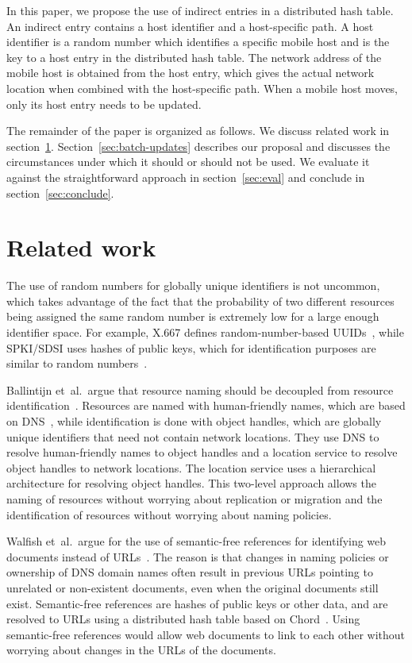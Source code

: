 \documentclass{article}
\newcommand{\etal}{et~al.}
\begin{document}
In this paper, we propose the use of indirect entries in a distributed
hash table.  An indirect entry contains a host identifier and a
host-specific path.  A host identifier is a random number which
identifies a specific mobile host and is the key to a host entry in
the distributed hash table.  The network address of the mobile host is
obtained from the host entry, which gives the actual network location
when combined with the host-specific path.  When a mobile host moves,
only its host entry needs to be updated.

The remainder of the paper is organized as follows.  We discuss
related work in section~\ref{sec:related-work}.
Section~\ref{sec:batch-updates} describes our proposal and discusses
the circumstances under which it should or should not be used.  We
evaluate it against the straightforward approach in
section~\ref{sec:eval} and conclude in section~\ref{sec:conclude}.


\section{Related work}
\label{sec:related-work}

The use of random numbers for globally unique identifiers is not
uncommon, which takes advantage of the fact that the probability of
two different resources being assigned the same random number is
extremely low for a large enough identifier space.  For example, X.667
defines random-number-based UUIDs~\cite{x667}, while SPKI/SDSI uses
hashes of public keys, which for identification purposes are similar
to random numbers~\cite{rfc2693}.

Ballintijn \etal\ argue that resource naming should be decoupled from
resource identification~\cite{ballintijn:internet2001}.  Resources are
named with human-friendly names, which are based on
DNS~\cite{mockapetris:sigcomm1988}, while identification is done with
object handles, which are globally unique identifiers that need not
contain network locations.  They use DNS to resolve human-friendly
names to object handles and a location service to resolve object
handles to network locations.  The location service uses a
hierarchical architecture for resolving object handles.  This
two-level approach allows the naming of resources without worrying
about replication or migration and the identification of resources
without worrying about naming policies.

Walfish \etal\ argue for the use of semantic-free references for
identifying web documents instead of URLs~\cite{walfish:nsdi2004}.
The reason is that changes in naming policies or ownership of DNS
domain names often result in previous URLs pointing to unrelated or
non-existent documents, even when the original documents still exist.
Semantic-free references are hashes of public keys or other data, and
are resolved to URLs using a distributed hash table based on
Chord~\cite{stoica:ton2003}.  Using semantic-free references would
allow web documents to link to each other without worrying about
changes in the URLs of the documents.
\end{document}
